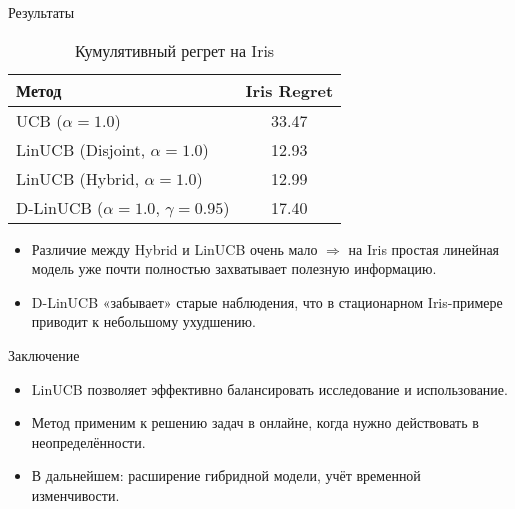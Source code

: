 \documentclass[10pt]{beamer}
\begin{document}
\begin{frame}{Результаты}
 \begin{table}[ht]
    \centering
    \begin{tabular}{l c}
      \hline
      \textbf{Метод} & \textbf{Iris Regret} \\
      \hline
      UCB (\(\alpha=1.0\)) & 33.47 \\
      LinUCB (Disjoint, \(\alpha=1.0\)) & 12.93 \\
      LinUCB (Hybrid, \(\alpha=1.0\)) & 12.99 \\
      D-LinUCB (\(\alpha=1.0,\,\gamma=0.95\)) & 17.40 \\
      \hline
    \end{tabular}
    \caption{Кумулятивный регрет на Iris}
  \end{table}
  \vspace{1em}
  \begin{itemize}
    \item Различие между Hybrid и LinUCB очень мало $\Longrightarrow$ на Iris простая линейная модель уже почти полностью захватывает полезную информацию.
    \item D-LinUCB «забывает» старые наблюдения, что в стационарном Iris-примере приводит к небольшому ухудшению.
  \end{itemize}
\end{frame}
\begin{frame}{Заключение}
  \begin{itemize}
    \item LinUCB позволяет эффективно балансировать исследование и использование.
    \item Метод применим к решению задач в онлайне, когда нужно действовать в неопределённости.
    \item В дальнейшем: расширение гибридной модели, учёт временной изменчивости.
  \end{itemize}
\end{frame}
\end{document}
